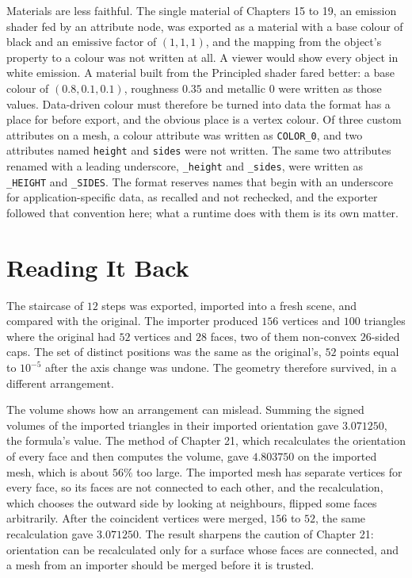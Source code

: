 Materials are less faithful. The single material of Chapters 15 to 19, an emission shader fed by an attribute node, was exported as a material with a base colour of black and an emissive factor of $(1,1,1)$, and the mapping from the object's property to a colour was not written at all. A viewer would show every object in white emission. A material built from the Principled shader fared better: a base colour of $(0.8,0.1,0.1)$, roughness $0.35$ and metallic $0$ were written as those values. Data-driven colour must therefore be turned into data the format has a place for before export, and the obvious place is a vertex colour. Of three custom attributes on a mesh, a colour attribute was written as \texttt{COLOR\_0}, and two attributes named \texttt{height} and \texttt{sides} were not written. The same two attributes renamed with a leading underscore, \texttt{\_height} and \texttt{\_sides}, were written as \texttt{\_HEIGHT} and \texttt{\_SIDES}. The format reserves names that begin with an underscore for application-specific data, as recalled and not rechecked, and the exporter followed that convention here; what a runtime does with them is its own matter.

\section{Reading It Back}

The staircase of $12$ steps was exported, imported into a fresh scene, and compared with the original. The importer produced $156$ vertices and $100$ triangles where the original had $52$ vertices and $28$ faces, two of them non-convex $26$-sided caps. The set of distinct positions was the same as the original's, $52$ points equal to $10^{-5}$ after the axis change was undone. The geometry therefore survived, in a different arrangement.

The volume shows how an arrangement can mislead. Summing the signed volumes of the imported triangles in their imported orientation gave $3.071250$, the formula's value. The method of Chapter 21, which recalculates the orientation of every face and then computes the volume, gave $4.803750$ on the imported mesh, which is about $56\%$ too large. The imported mesh has separate vertices for every face, so its faces are not connected to each other, and the recalculation, which chooses the outward side by looking at neighbours, flipped some faces arbitrarily. After the coincident vertices were merged, $156$ to $52$, the same recalculation gave $3.071250$. The result sharpens the caution of Chapter 21: orientation can be recalculated only for a surface whose faces are connected, and a mesh from an importer should be merged before it is trusted.

